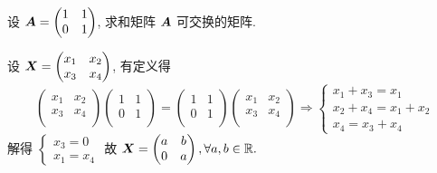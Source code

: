 \begin{example}
    设 $\vb*{A}=\begin{pmatrix} 1 & 1 \\ 0 & 1 \\\end{pmatrix}$, 求和矩阵 $\vb*{A}$ 可交换的矩阵.
\end{example}
\begin{solution}
    设 $\vb*{X}=\begin{pmatrix} x_1 & x_2 \\ x_3 & x_4 \\\end{pmatrix}$, 有定义得
    $$
    \begin{pmatrix} x_1 & x_2 \\ x_3 & x_4 \\\end{pmatrix}\begin{pmatrix} 1 & 1 \\ 0 & 1 \\\end{pmatrix}=\begin{pmatrix} 1 & 1 \\ 0 & 1 \\\end{pmatrix}\begin{pmatrix} x_1 & x_2 \\ x_3 & x_4 \\\end{pmatrix}\Rightarrow \begin{cases}
        x_1+x_3=x_1\\ 
        x_2+x_4=x_1+x_2\\ 
        x_4=x_3+x_4
    \end{cases}
    $$
    解得 $\begin{cases}
        x_3=0\\ x_1=x_4
    \end{cases}$ 故 $\vb*{X}=\begin{pmatrix} a & b \\ 0 & a \\\end{pmatrix},\forall a,b\in \mathbb{R}.$
\end{solution}

